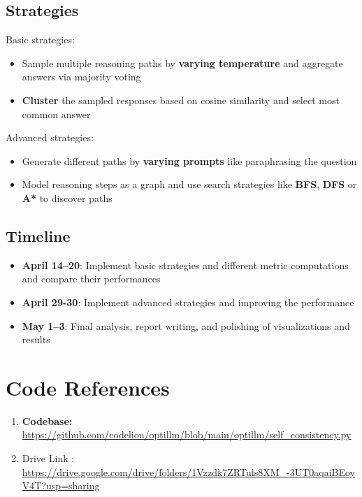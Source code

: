 \documentclass[24pt]{article}
\begin{document}
\subsection{Strategies}
Basic strategies:
\begin{itemize}
    \item Sample multiple reasoning paths by \textbf{varying temperature} and aggregate answers via majority voting
    \item \textbf{Cluster} the sampled responses based on cosine similarity and select most common answer
\end{itemize}
Advanced strategies:
\begin{itemize}
    \item Generate different paths by \textbf{varying prompts} like paraphrasing the question
    \item Model reasoning steps as a graph and use search strategies like \textbf{BFS}, \textbf{DFS} or \textbf{A*} to discover paths
\end{itemize}

\subsection{Timeline}
\begin{itemize}
    \item \textbf{April 14–20}: Implement basic strategies and different metric computations and compare their performances
    \item \textbf{April 29-30}: Implement advanced strategies and improving the performance
    \item \textbf{May 1–3}: Final analysis, report writing, and polishing of visualizations and results
\end{itemize}

\section{Code References}
\begin{enumerate}
    \item \textbf{Codebase:} \url{https://github.com/codelion/optillm/blob/main/optillm/self_consistency.py}
    \item Drive Link : \url{https://drive.google.com/drive/folders/1Vzzdk7ZRTuls8XM_-3UT0aqaiBEoyV4T?usp=sharing}
\end{enumerate}
\end{document}
